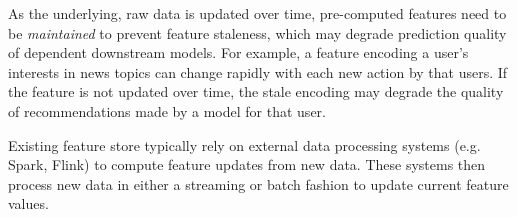 

As the underlying, raw data is updated over time, pre-computed features need to be \textit{maintained} to prevent feature staleness, which may degrade prediction quality of dependent downstream models. For example, a feature encoding a user's interests in news topics can change rapidly with each new action by that users. If the feature is not updated over time, the stale encoding may degrade the quality of recommendations made by a model for that user. 

Existing feature store typically rely on external data processing systems (e.g. Spark, Flink) to compute feature updates from new data. These systems then process new data in either a streaming or batch fashion to update current feature values.


